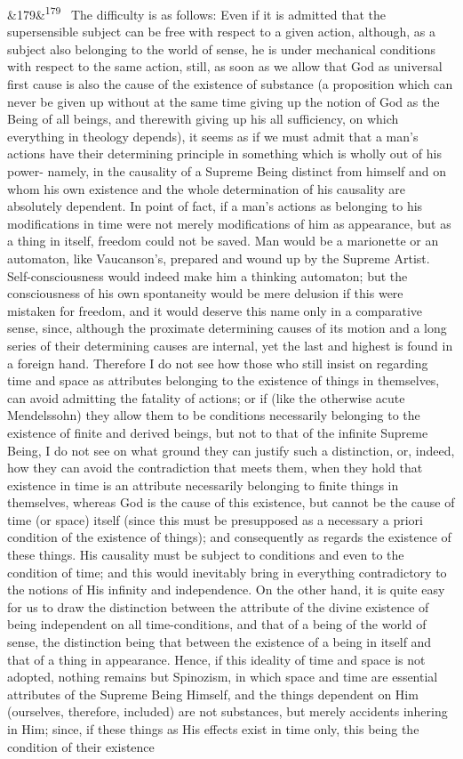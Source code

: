 \documentclass[12pt]{article}
\newcommand{\para}[1][]{\par\noindent\ifx&#1&\else\textsuperscript{\footnotesize #1}~\fi}
\begin{document}
\para[179] The difficulty is as follows: Even if it is admitted that the supersensible subject can be free with respect to a given action, although, as a subject also belonging to the world of sense, he is under mechanical conditions with respect to the same action, still, as soon as we allow that God as universal first cause is also the cause of the existence of substance (a proposition which can never be given up without at the same time giving up the notion of God as the Being of all beings, and therewith giving up his all sufficiency, on which everything in theology depends), it seems as if we must admit that a man's actions have their determining principle in something which is wholly out of his power- namely, in the causality of a Supreme Being distinct from himself and on whom his own existence and the whole determination of his causality are absolutely dependent. In point of fact, if a man's actions as belonging to his modifications in time were not merely modifications of him as appearance, but as a thing in itself, freedom could not be saved. Man would be a marionette or an automaton, like Vaucanson's, prepared and wound up by the Supreme Artist. Self-consciousness would indeed make him a thinking automaton; but the consciousness of his own spontaneity would be mere delusion if this were mistaken for freedom, and it would deserve this name only in a comparative sense, since, although the proximate determining causes of its motion and a long series of their determining causes are internal, yet the last and highest is found in a foreign hand. Therefore I do not see how those who still insist on regarding time and space as attributes belonging to the existence of things in themselves, can avoid admitting the fatality of actions; or if (like the otherwise acute Mendelssohn) they allow them to be conditions necessarily belonging to the existence of finite and derived beings, but not to that of the infinite Supreme Being, I do not see on what ground they can justify such a distinction, or, indeed, how they can avoid the contradiction that meets them, when they hold that existence in time is an attribute necessarily belonging to finite things in themselves, whereas God is the cause of this existence, but cannot be the cause of time (or space) itself (since this must be presupposed as a necessary a priori condition of the existence of things); and consequently as regards the existence of these things. His causality must be subject to conditions and even to the condition of time; and this would inevitably bring in everything contradictory to the notions of His infinity and independence. On the other hand, it is quite easy for us to draw the distinction between the attribute of the divine existence of being independent on all time-conditions, and that of a being of the world of sense, the distinction being that between the existence of a being in itself and that of a thing in appearance. Hence, if this ideality of time and space is not adopted, nothing remains but Spinozism, in which space and time are essential attributes of the Supreme Being Himself, and the things dependent on Him (ourselves, therefore, included) are not substances, but merely accidents inhering in Him; since, if these things as His effects exist in time only, this being the condition of their existence 
\end{document}
